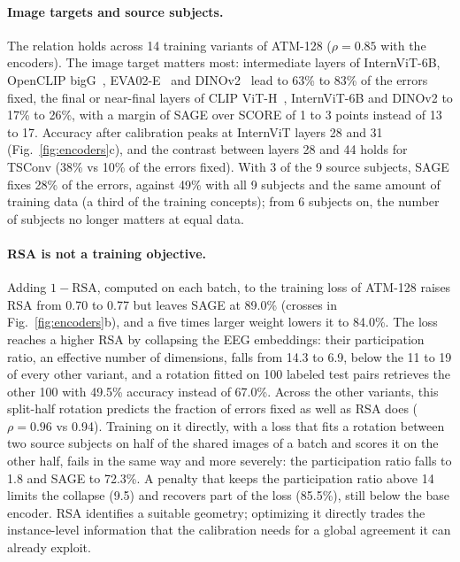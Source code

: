 \documentclass[10pt,twocolumn,letterpaper]{article}
\begin{document}
\paragraph{Image targets and source subjects.}
The relation holds across 14 training variants of ATM-128 ($\rho=0.85$ with the encoders). The image target matters most: intermediate layers of InternViT-6B, OpenCLIP bigG~\cite{cherti2023openclip}, EVA02-E~\cite{fang2023eva02} and DINOv2~\cite{oquab2024dinov2} lead to 63\% to 83\% of the errors fixed, the final or near-final layers of CLIP ViT-H~\cite{radford2021clip}, InternViT-6B and DINOv2 to 17\% to 26\%, with a margin of SAGE over SCORE of 1 to 3 points instead of 13 to 17. Accuracy after calibration peaks at InternViT layers 28 and 31 (Fig.~\ref{fig:encoders}c), and the contrast between layers 28 and 44 holds for TSConv (38\% vs 10\% of the errors fixed). With 3 of the 9 source subjects, SAGE fixes 28\% of the errors, against 49\% with all 9 subjects and the same amount of training data (a third of the training concepts); from 6 subjects on, the number of subjects no longer matters at equal data.

\paragraph{RSA is not a training objective.}
Adding $1-\mathrm{RSA}$, computed on each batch, to the training loss of ATM-128 raises RSA from 0.70 to 0.77 but leaves SAGE at 89.0\% (crosses in Fig.~\ref{fig:encoders}b), and a five times larger weight lowers it to 84.0\%. The loss reaches a higher RSA by collapsing the EEG embeddings: their participation ratio, an effective number of dimensions, falls from 14.3 to 6.9, below the 11 to 19 of every other variant, and a rotation fitted on 100 labeled test pairs retrieves the other 100 with 49.5\% accuracy instead of 67.0\%. Across the other variants, this split-half rotation predicts the fraction of errors fixed as well as RSA does ($\rho=0.96$ vs 0.94). Training on it directly, with a loss that fits a rotation between two source subjects on half of the shared images of a batch and scores it on the other half, fails in the same way and more severely: the participation ratio falls to 1.8 and SAGE to 72.3\%. A penalty that keeps the participation ratio above 14 limits the collapse (9.5) and recovers part of the loss (85.5\%), still below the base encoder. RSA identifies a suitable geometry; optimizing it directly trades the instance-level information that the calibration needs for a global agreement it can already exploit.
\end{document}
